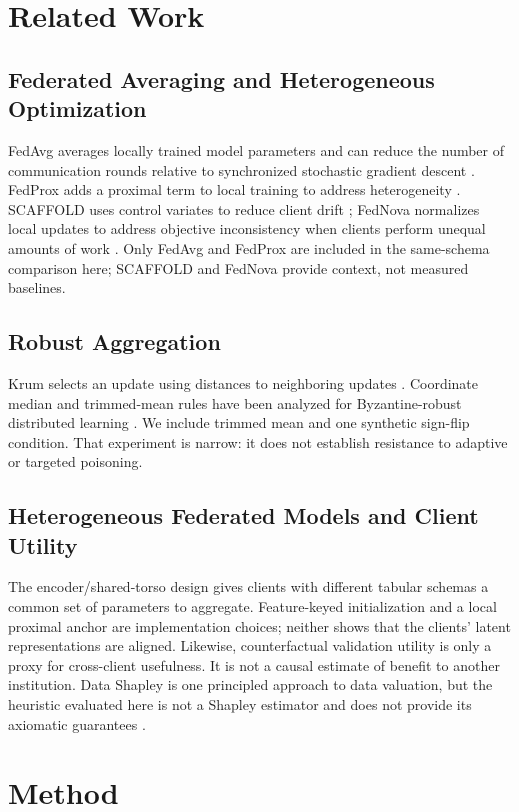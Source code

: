 \documentclass{ieeeaccess}
\begin{document}
\section{Related Work}
\subsection{Federated Averaging and Heterogeneous Optimization}
FedAvg averages locally trained model parameters and can reduce the number of
communication rounds relative to synchronized stochastic gradient descent
\cite{mcmahan2017}. FedProx adds a proximal term to local training to address
heterogeneity \cite{li2020}. SCAFFOLD uses control variates to reduce client
drift \cite{karimireddy2020}; FedNova normalizes local updates to address
objective inconsistency when clients perform unequal amounts of work
\cite{wang2020}. Only FedAvg and FedProx are included in the same-schema
comparison here; SCAFFOLD and FedNova provide context, not measured baselines.

\subsection{Robust Aggregation}
Krum selects an update using distances to neighboring updates
\cite{blanchard2017}. Coordinate median and trimmed-mean rules have been
analyzed for Byzantine-robust distributed learning \cite{yin2018}. We include
trimmed mean and one synthetic sign-flip condition. That experiment is narrow:
it does not establish resistance to adaptive or targeted poisoning.

\subsection{Heterogeneous Federated Models and Client Utility}
The encoder/shared-torso design gives clients with different tabular schemas
a common set of parameters to aggregate. Feature-keyed initialization and a
local proximal anchor are implementation choices; neither shows that the
clients' latent representations are aligned. Likewise, counterfactual
validation utility is only a proxy for cross-client usefulness. It is not a
causal estimate of benefit to another institution. Data Shapley is one
principled approach to data valuation, but the heuristic evaluated here is
not a Shapley estimator and does not provide its axiomatic guarantees
\cite{ghorbani2019}.

\section{Method}
\end{document}
